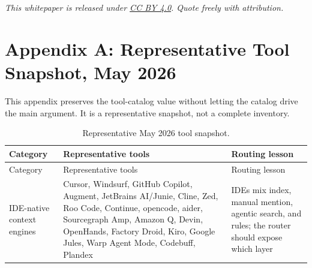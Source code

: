 \documentclass[
  11pt,
  letterpaper,
  numbers=noendperiod,
  parskip=half]{scrartcl}
\begin{document}
\emph{This whitepaper is released under
\href{https://creativecommons.org/licenses/by/4.0/}{CC BY 4.0}. Quote
freely with attribution.}

\section{Appendix A: Representative Tool Snapshot, May
2026}\label{sec-tools-appendix}

This appendix preserves the tool-catalog value without letting the
catalog drive the main argument. It is a representative snapshot, not a
complete inventory.

\figureToolLandscapeCounts

\begin{longtable}[]{@{}
  >{\raggedright\arraybackslash}p{}
  >{\raggedright\arraybackslash}p{}
  >{\raggedright\arraybackslash}p{}@{}}
\caption{Representative May 2026 tool
snapshot.}\label{tbl-tool-snapshot}\tabularnewline
\toprule\noalign{}
\begin{minipage}[b]{\linewidth}\raggedright
Category
\end{minipage} & \begin{minipage}[b]{\linewidth}\raggedright
Representative tools
\end{minipage} & \begin{minipage}[b]{\linewidth}\raggedright
Routing lesson
\end{minipage} \\
\midrule\noalign{}
\endfirsthead
\toprule\noalign{}
\begin{minipage}[b]{\linewidth}\raggedright
Category
\end{minipage} & \begin{minipage}[b]{\linewidth}\raggedright
Representative tools
\end{minipage} & \begin{minipage}[b]{\linewidth}\raggedright
Routing lesson
\end{minipage} \\
\midrule\noalign{}
\endhead
\bottomrule\noalign{}
\endlastfoot
IDE-native context engines & Cursor, Windsurf, GitHub Copilot, Augment,
JetBrains AI/Junie, Cline, Zed, Roo Code, Continue, opencode, aider,
Sourcegraph Amp, Amazon Q, Devin, OpenHands, Factory Droid, Kiro, Google
Jules, Warp Agent Mode, Codebuff, Plandex & IDEs mix index, manual
mention, agentic search, and rules; the router should expose which layer

\end{longtable}
\end{document}
